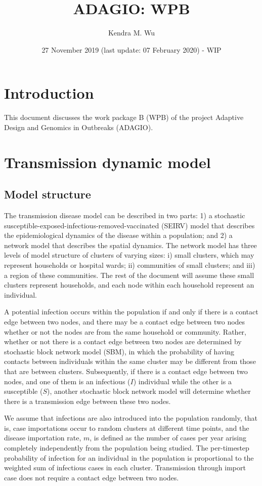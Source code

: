 \documentclass[a4paper]{article}
\title{ADAGIO: WPB}
\author{Kendra M. Wu}
\date{27 November 2019 (last update: 07 February 2020) - WIP}
\begin{document}
	\maketitle
	
	\section{Introduction}
	This document discusses the work package B (WPB) of the project Adaptive Design and Genomics in Outbreaks (ADAGIO).

	\section{Transmission dynamic model}
	\label{sec:TransModel}
	\subsection{Model structure}
	The transmission disease model can be described in two parts: 1) a stochastic susceptible-exposed-infectious-removed-vaccinated (SEIRV) model that describes the epidemiological dynamics of the disease within a population; and 2) a network model that describes the spatial dynamics. The network model has three levels of model structure of clusters of varying sizes: i) small clusters, which may represent households or hospital wards; ii) communities of small clusters; and iii) a region of these communities. The rest of the document will assume these small clusters represent households, and each node within each household represent an individual. 
	
	A potential infection occurs within the population if and only if there is a contact edge between two nodes, and there may be a contact edge between two nodes whether or not the nodes are from the same household or community. Rather, whether or not there is a contact edge between two nodes are determined by stochastic block network model (SBM), in which the probability of having contacts between individuals within the same cluster may be different from those that are between clusters. Subsequently, if there is a contact edge between two nodes, and one of them is an infectious ($I$) individual while the other is a susceptible ($S$), another stochastic block network model will determine whether there is a transmission edge between these two nodes. 
	
	We assume that infections are also introduced into the population randomly, that is, case importations occur to random clusters at different time points, and the disease importation rate, $m$, is defined as the number of cases per year arising completely independently from the population being studied. The per-timestep probability of infection for an individual in the population is proportional to the weighted sum of infectious cases in each cluster. Transmission through import case does not require a contact edge between two nodes.
	
\end{document}
